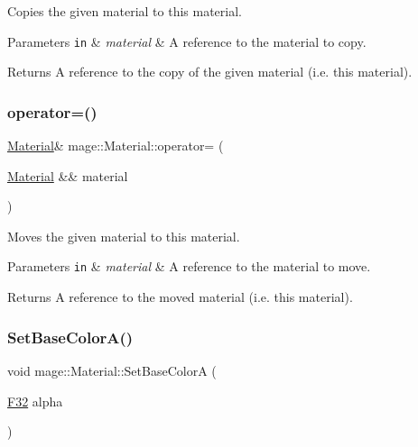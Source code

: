 Copies the given material to this material.


\begin{DoxyParams}[1]{Parameters}
\mbox{\tt in}  & {\em material} & A reference to the material to copy. \\
\hline
\end{DoxyParams}
\begin{DoxyReturn}{Returns}
A reference to the copy of the given material (i.\+e. this material). 
\end{DoxyReturn}
\hypertarget{structmage_1_1_material_a500a2ebe99d4d7b3be5bf57b6bff62a1}{}\label{structmage_1_1_material_a500a2ebe99d4d7b3be5bf57b6bff62a1} 
\subsubsection{\texorpdfstring{operator=()}{operator=()}\hspace{0.1cm}{\footnotesize\ttfamily [2/2]}}
{\footnotesize\ttfamily \hyperlink{structmage_1_1_material}{Material}\& mage\+::\+Material\+::operator= (\begin{DoxyParamCaption}\item[{\hyperlink{structmage_1_1_material}{Material} \&\&}]{material }\end{DoxyParamCaption})\hspace{0.3cm}{\ttfamily [default]}}

Moves the given material to this material.


\begin{DoxyParams}[1]{Parameters}
\mbox{\tt in}  & {\em material} & A reference to the material to move. \\
\hline
\end{DoxyParams}
\begin{DoxyReturn}{Returns}
A reference to the moved material (i.\+e. this material). 
\end{DoxyReturn}
\hypertarget{structmage_1_1_material_a0acb6bb48a964d61199cf0f022e900fa}{}\label{structmage_1_1_material_a0acb6bb48a964d61199cf0f022e900fa} 
\subsubsection{\texorpdfstring{Set\+Base\+Color\+A()}{SetBaseColorA()}}
{\footnotesize\ttfamily void mage\+::\+Material\+::\+Set\+Base\+ColorA (\begin{DoxyParamCaption}\item[{\hyperlink{namespacemage_aa97e833b45f06d60a0a9c4fc22ae02c0}{F32}}]{alpha }\end{DoxyParamCaption})\hspace{0.3cm}{\ttfamily [noexcept]}}

